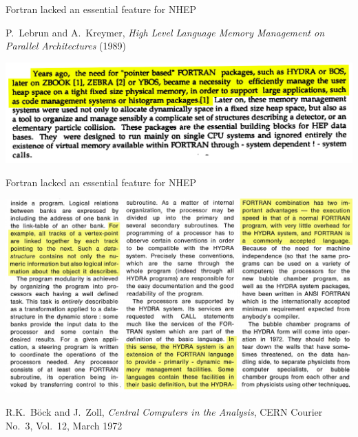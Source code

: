 \documentclass[aspectratio=169]{beamer}
\begin{document}
\begin{frame}{Fortran lacked an essential feature for NHEP}
\vspace{0.25 cm}
\begin{center}
\begin{minipage}{0.8\linewidth}
\begin{center}
P.\ Lebrun and A.\ Kreymer, {\it High Level Language Memory Management on Parallel Architectures} (1989)
\end{center}
\end{minipage}

\includegraphics[width=0.9\linewidth]{PLOTS/lebrun-kreymer-zebra.png}
\end{center}
\end{frame}

\begin{frame}{Fortran lacked an essential feature for NHEP}
\scriptsize
\vspace{0.25 cm}
\begin{center}
\includegraphics[width=0.85\linewidth]{PLOTS/hydra-1.png}

R.K.\ B\"ock and J.\ Zoll, {\it Central Computers in the Analysis}, CERN Courier No.\ 3, Vol.\ 12, March 1972
\end{center}
\end{frame}
\end{document}
